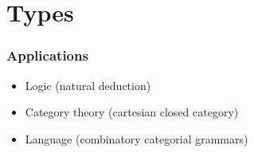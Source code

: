 \documentclass[aspectratio=169]{beamer}
\begin{document}
\section{Types}


\begin{frame}
  \frametitle{Applications}

  \begin{itemize}
    \item Logic (natural deduction)
    \item Category theory (cartesian closed category)
    \item Language (combinatory categorial grammars)
  \end{itemize}

\end{frame}
\end{document}
